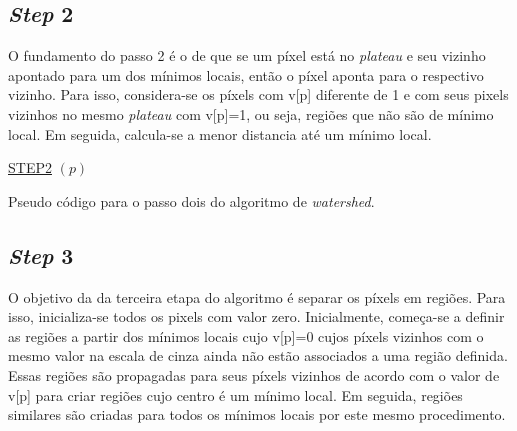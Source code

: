 \subsection{\textit{Step } 2} 
O fundamento do passo 2 é o de que se um píxel está no \textit{plateau} e seu vizinho apontado para um dos mínimos locais, então o píxel aponta para o respectivo vizinho. Para isso, considera-se os píxels com v[p] diferente de 1 e com seus pixels vizinhos no mesmo \textit{plateau} com v[p]=1, ou seja, regiões que não são de mínimo local. Em seguida, calcula-se a menor distancia até um mínimo local.

\begin{algorithm}[H]
\SetAlgoLined


    \underline{STEP2} $(p)$\;
		
 
\caption{Pseudo código para o passo dois do algoritmo de \textit{watershed}. \cite{ruparelia2012implementation}}
\end{algorithm}


\subsection{\textit{Step } 3}
O objetivo da da terceira etapa do algoritmo é separar os píxels em regiões. Para isso, inicializa-se todos os pixels com valor zero. Inicialmente, começa-se a definir as regiões a partir dos mínimos locais cujo v[p]=0 cujos píxels vizinhos com o mesmo valor na escala de cinza ainda não estão associados a uma região definida. Essas regiões são propagadas para seus píxels vizinhos de acordo com o valor de v[p] para criar regiões cujo centro é um mínimo local. Em seguida, regiões similares são criadas para todos os mínimos locais por este mesmo procedimento.

